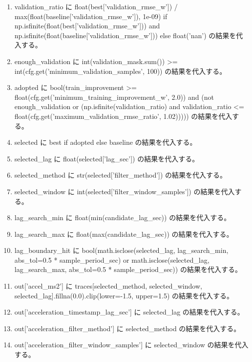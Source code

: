 \documentclass[a4paper,11pt]{article}
\begin{document}
\begin{enumerate}[leftmargin=1.8em]
\item validation\_ratio に float(best['validation\_rmse\_w']) / max(float(baseline['validation\_rmse\_w']), 1e-09) if np.isfinite(float(best['validation\_rmse\_w'])) and np.isfinite(float(baseline['validation\_rmse\_w'])) else float('nan') の結果を代入する。
\item enough\_validation に int(validation\_mask.sum()) >= int(cfg.get('minimum\_validation\_samples', 100)) の結果を代入する。
\item adopted に bool(train\_improvement >= float(cfg.get('minimum\_training\_improvement\_w', 2.0)) and (not enough\_validation or (np.isfinite(validation\_ratio) and validation\_ratio <= float(cfg.get('maximum\_validation\_rmse\_ratio', 1.02))))) の結果を代入する。
\item selected に best if adopted else baseline の結果を代入する。
\item selected\_lag に float(selected['lag\_sec']) の結果を代入する。
\item selected\_method に str(selected['filter\_method']) の結果を代入する。
\item selected\_window に int(selected['filter\_window\_samples']) の結果を代入する。
\item lag\_search\_min に float(min(candidate\_lag\_sec)) の結果を代入する。
\item lag\_search\_max に float(max(candidate\_lag\_sec)) の結果を代入する。
\item lag\_boundary\_hit に bool(math.isclose(selected\_lag, lag\_search\_min, abs\_tol=0.5 * sample\_period\_sec) or math.isclose(selected\_lag, lag\_search\_max, abs\_tol=0.5 * sample\_period\_sec)) の結果を代入する。
\item out['accel\_ms2'] に traces[selected\_method, selected\_window, selected\_lag].fillna(0.0).clip(lower=-1.5, upper=1.5) の結果を代入する。
\item out['acceleration\_timestamp\_lag\_sec'] に selected\_lag の結果を代入する。
\item out['acceleration\_filter\_method'] に selected\_method の結果を代入する。
\item out['acceleration\_filter\_window\_samples'] に selected\_window の結果を代入する。

\end{enumerate}
\end{document}
